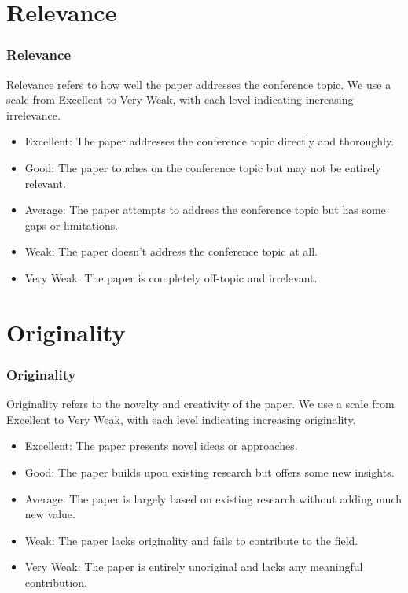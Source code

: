 \documentclass{beamer}
\begin{document}
\section*{Relevance}
\begin{frame}
    \frametitle{Relevance}
    \bigskip
    Relevance refers to how well the paper addresses the conference topic.
    We use a scale from Excellent to Very Weak, with each level indicating increasing irrelevance.
    \begin{itemize}
        \item Excellent: The paper addresses the conference topic directly and thoroughly.
        \item Good: The paper touches on the conference topic but may not be entirely relevant.
        \item Average: The paper attempts to address the conference topic but has some gaps or limitations.
        \item Weak: The paper doesn't address the conference topic at all.
        \item Very Weak: The paper is completely off-topic and irrelevant.
    \end{itemize}
\bigskip
\end{frame}

\section*{Originality}
\begin{frame}
    \frametitle{Originality}
    \bigskip
    Originality refers to the novelty and creativity of the paper.
    We use a scale from Excellent to Very Weak, with each level indicating increasing originality.
    \begin{itemize}
        \item Excellent: The paper presents novel ideas or approaches.
        \item Good: The paper builds upon existing research but offers some new insights.
        \item Average: The paper is largely based on existing research without adding much new value.
        \item Weak: The paper lacks originality and fails to contribute to the field.
        \item Very Weak: The paper is entirely unoriginal and lacks any meaningful contribution.
    \end{itemize}
\bigskip
\end{frame}
\end{document}
